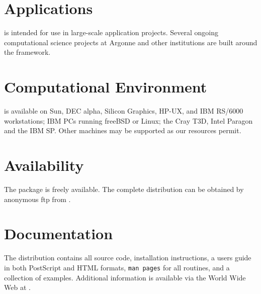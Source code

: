 \section*{Applications}
 is intended for use in large-scale application projects. 
Several ongoing computational science projects at Argonne and
other institutions are built around the  framework.

\section*{Computational Environment}
 is available on Sun, DEC alpha, Silicon Graphics, HP-UX, and IBM
RS/6000 workstations; IBM PCs running freeBSD or Linux; the Cray T3D,
Intel Paragon and the IBM SP. Other machines may be supported as our
resources permit.

\section*{Availability}

The  package is freely available.
The complete distribution can be obtained by anonymous ftp from 
.

\section*{Documentation}

The  distribution contains all source code, 
installation instructions,
a users guide in both PostScript and HTML formats, 
{\tt man pages} for all routines,
and a collection of examples.
Additional information is available via the World Wide Web at
.
\makeinfo

